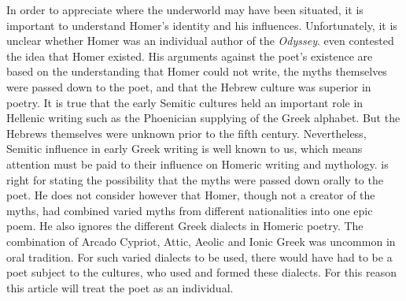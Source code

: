 In order to appreciate where the underworld may have been situated, it is important to understand Homer’s identity and his influences. Unfortunately, it is unclear whether Homer was an individual author of the \emph{Odyssey}. \textcite[xi–-xii]{Parry1987} even contested the idea that Homer existed. His arguments against the poet’s existence are based on the understanding that Homer could not write, the myths themselves were passed down to the poet, and that the Hebrew culture was superior in poetry. It is true that the early Semitic cultures held an important role in Hellenic writing such as the Phoenician supplying of the Greek alphabet. But the Hebrews themselves were unknown prior to the fifth century\BC. Nevertheless, Semitic influence in early Greek writing is well known to us, which means attention must be paid to their influence on Homeric writing and mythology. \textcite{Parry1987} is right for stating the possibility that the myths were passed down orally to the poet. He does not consider however that Homer, though not a creator of the myths, had combined varied myths from different nationalities into one epic poem. He also ignores the different Greek dialects in Homeric poetry. The combination of Arcado Cypriot, Attic, Aeolic and Ionic Greek was uncommon in oral tradition. For such varied dialects to be used, there would have had to be a poet subject to the cultures, who used and formed these dialects.  For this reason this article will treat the poet as an individual.
	

